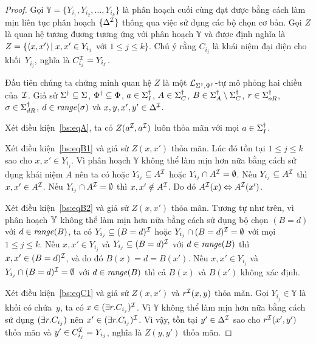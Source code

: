 \begin{proof}
	Gọi $\mathbb{Y} = \{Y_{i_1}, Y_{i_2}, \ldots ,Y_{i_k}\}$ là phân hoạch cuối cùng đạt được bằng cách làm mịn liên tục phân hoạch $\{\Delta^{\mathcal{I}}\}$ thông qua việc sử dụng các bộ chọn cơ bản. Gọi $Z$ là quan hệ tương đương tương ứng với phân hoạch $\mathbb{Y}$ và được định nghĩa là $Z = \{\left\langle x,x'\right\rangle\! \mid x,x' \in Y_{i_j}$ với $1 \leq j \leq k\}$. Chú ý rằng $C_{i_j}$ là khái niệm đại diện cho khối~$Y_{i_j}$, nghĩa là $C_{i_j}^{\mathcal{I}} = Y_{i_j}$.
	
	Đầu tiên chúng ta chứng minh quan hệ $Z$ là một $\mathcal{L}_{\Sigma^\dag,\Phi^\dag}$-tự mô phỏng hai chiều của~$\mathcal{I}$. Giả sử $\Sigma^\dag \subseteq \Sigma$, $\Phi^\dag \subseteq \Phi$, $a \in \Sigma^\dag_I$, $A \in \Sigma^\dag_C$, $B \in \Sigma^\dag_A\setminus\Sigma^\dag_C$, $r \in \Sigma^\dag_{oR}$, $\sigma \in \Sigma^\dag_{dR}$, $d \in \mathit{range}(\sigma)$ và $x,y,x',y' \in \Delta^{\mathcal{I}}$.
	
	\semiItem{}Xét điều kiện~\eqref{bs:eqA}, ta có $Z(a^{\mathcal{I}}, a^{\mathcal{I}})$ luôn thỏa mãn với mọi $a \in \Sigma^\dag_I$.
	
	\semiItem{}Xét điều kiện~\eqref{bs:eqB1} và giả sử $Z(x,x')$ thỏa mãn. Lúc đó tồn tại $1 \leq j \leq k$ sao cho $x, x' \in Y_{i_j}$.
	Vì phân hoạch $\mathbb{Y}$ không thể làm mịn hơn nữa bằng cách sử dụng khái niệm $A$ nên ta có hoặc $Y_{i_j} \subseteq A^{\mathcal{I}}$ hoặc $Y_{i_j} \cap A^{\mathcal{I}} = \emptyset$.
	Nếu $Y_{i_j} \subseteq A^{\mathcal{I}}$ thì $x, x' \in A^{\mathcal{I}}$.
	Nếu $Y_{i_j} \cap A^{\mathcal{I}} = \emptyset$ thì $x, x' \notin A^{\mathcal{I}}$. Do đó $A^{\mathcal{I}}(x) \Leftrightarrow A^{\mathcal{I}}(x')$.
	
	\semiItem Xét điều kiện~\eqref{bs:eqB2} và giả sử $Z(x,x')$ thỏa mãn. Tương tự như trên, vì phân hoạch $\mathbb{Y}$ không thể làm mịn hơn nữa bằng cách sử dụng bộ chọn $(B=d)$ với $d \in \mathit{range}(B)$, ta có $Y_{i_j} \subseteq (B=d)^{\mathcal{I}}$ hoặc $Y_{i_j} \cap (B=d)^{\mathcal{I}} = \emptyset$ với mọi $1 \leq j \leq k$. Nếu $x, x' \in Y_{i_j}$ và $Y_{i_j} \subseteq (B=d)^{\mathcal{I}}$ với $d \in \mathit{range}(B)$ thì $x, x' \in (B=d)^{\mathcal{I}}$, và do đó $B(x) = d = B(x')$. Nếu $x, x' \in Y_{i_j}$ và $Y_{i_j} \cap (B=d)^{\mathcal{I}} = \emptyset$ với $d \in \mathit{range}(B)$ thì cả $B(x)$ và $B(x')$ không xác định.
	
	\semiItem{}Xét điều kiện~\eqref{bs:eqC1} và giả sử $Z(x,x')$ và $r^{\mathcal{I}}(x,y)$ thỏa mãn. Gọi $Y_{i_j} \in \mathbb{Y}$ là khối có chứa~$y$, ta có $x \in (\exists r.C_{i_j})^{\mathcal{I}}$. Vì $\mathbb{Y}$ không thể làm mịn hơn nữa bằng cách sử dụng $(\exists r.C_{i_j})$ nên $x' \in (\exists r.C_{i_j})^{\mathcal{I}}$. Vì vậy, tồn tại $y' \in \Delta^{\mathcal{I}}$ sao cho $r^{\mathcal{I}}(x',y')$ thỏa mãn và $y' \in C_{i_j}^{\mathcal{I}} = Y_{i_j}$, nghĩa là $Z(y,y')$ thỏa mãn.
	

\end{proof}
